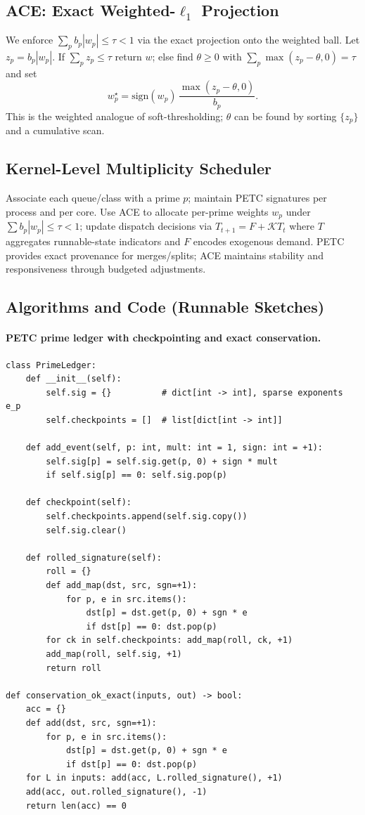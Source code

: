 \documentclass[11pt]{article}
\theoremstyle{definition}
\theoremstyle{remark}
\newcommand{\1}{\mathbf{1}}
\begin{document}
\subsection{ACE: Exact Weighted-\texorpdfstring{$\ell_1$}{l1} Projection}
We enforce $\sum_p b_p|w_p|\le\tau<1$ via the exact projection onto the weighted ball. Let $z_p=b_p|w_p|$. If $\sum_p z_p\le\tau$ return $w$; else find $\theta\ge0$ with $\sum_p \max(z_p-\theta,0)=\tau$ and set
\[
w_p^\star=\mathrm{sign}(w_p)\,\frac{\max(z_p-\theta,0)}{b_p}.
\]
This is the weighted analogue of soft-thresholding; $\theta$ can be found by sorting $\{z_p\}$ and a cumulative scan.

\subsection{Kernel-Level Multiplicity Scheduler}
\label{sec:kernel_multiplicity}
Associate each queue/class with a prime $p$; maintain PETC signatures per process and per core. Use ACE to allocate per-prime weights $w_p$ under $\sum b_p|w_p|\le\tau<1$; update dispatch decisions via $T_{t+1}=F+\mathcal{K}T_t$ where $T$ aggregates runnable-state indicators and $F$ encodes exogenous demand. PETC provides exact provenance for merges/splits; ACE maintains stability and responsiveness through budgeted adjustments.

\subsection{Algorithms and Code (Runnable Sketches)}

\paragraph{PETC prime ledger with checkpointing and exact conservation.}
\begin{verbatim}
class PrimeLedger:
    def __init__(self):
        self.sig = {}          # dict[int -> int], sparse exponents e_p
        self.checkpoints = []  # list[dict[int -> int]]

    def add_event(self, p: int, mult: int = 1, sign: int = +1):
        self.sig[p] = self.sig.get(p, 0) + sign * mult
        if self.sig[p] == 0: self.sig.pop(p)

    def checkpoint(self):
        self.checkpoints.append(self.sig.copy())
        self.sig.clear()

    def rolled_signature(self):
        roll = {}
        def add_map(dst, src, sgn=+1):
            for p, e in src.items():
                dst[p] = dst.get(p, 0) + sgn * e
                if dst[p] == 0: dst.pop(p)
        for ck in self.checkpoints: add_map(roll, ck, +1)
        add_map(roll, self.sig, +1)
        return roll

def conservation_ok_exact(inputs, out) -> bool:
    acc = {}
    def add(dst, src, sgn=+1):
        for p, e in src.items():
            dst[p] = dst.get(p, 0) + sgn * e
            if dst[p] == 0: dst.pop(p)
    for L in inputs: add(acc, L.rolled_signature(), +1)
    add(acc, out.rolled_signature(), -1)
    return len(acc) == 0
\end{verbatim}
\end{document}
